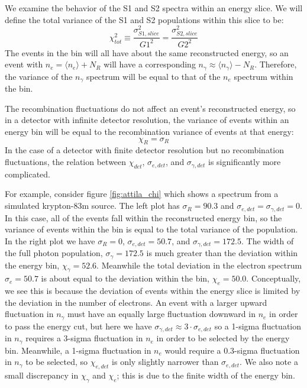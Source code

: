 We examine the behavior of the S1 and S2 spectra within an energy slice. We will define the total variance of the S1 and S2 populations within this slice to be:
\begin{equation}
\chi_{tot}^2\equiv  \frac{\sigma_{S1,slice}^2}{G1^2} = \frac{\sigma_{S2,slice}^2}{G2^2}
\end{equation}
The events in the bin will all have about the same reconstructed energy, so an event with $n_{e}=\langle n_{e} \rangle +N_R$ will have a corresponding $n_{\gamma}\approx \langle n_{\gamma} \rangle -N_R$. Therefore, the variance of the $n_{\gamma}$ spectrum will be equal to that of the $n_{e}$ spectrum within the bin. 

The recombination fluctuations do not affect an event's reconstructed energy, so in a detector with infinite detector resolution, the variance of events within an energy bin will be equal to the recombination variance of events at that energy:
\begin{equation} 
\chi_{R}=\sigma_{R}
\end{equation}
In the case of a detector with finite detector resolution but no recombination fluctuations, the relation between $\chi_{det}$, $\sigma_{e,det}$, and $\sigma_{\gamma,det}$ is significantly more complicated. 

For example, consider figure \ref{fig:attila_chi} which shows a spectrum from a simulated krypton-83m source. The left plot has $\sigma_R=90.3$ and $\sigma_{e,det}=\sigma_{\gamma,det}=0$. In this case, all of the events fall within the reconstructed energy bin, so the variance of events within the bin is equal to the total variance of the population. In the right plot we have $\sigma_R=0$, $\sigma_{e,det}=50.7$, and $\sigma_{\gamma,det}=172.5$. The width of the full photon population, $\sigma_{\gamma}=172.5$ is much greater than the deviation within the energy bin, $\chi_{\gamma}=52.6$. Meanwhile the total deviation in the electron spectrum $\sigma_{e}=50.7$ is about equal to the deviation within the bin, $\chi_e=50.0$. Conceptually, we see this is because the deviation of events within the energy slice is limited by the deviation in the number of electrons. An event with a larger upward fluctuation in $n_{\gamma}$ must have an equally large fluctuation downward in $n_{e}$ in order to pass the energy cut, but here we have $\sigma_{\gamma,det} \approx 3 \cdot \sigma_{e,det}$ so a 1-sigma fluctuation in $n_{\gamma}$ requires a 3-sigma fluctuation in $n_{e}$ in order to be selected by the energy bin. Meanwhile, a 1-sigma fluctuation in $n_{e}$ would require a 0.3-sigma fluctuation in $n_{\gamma}$ to be selected, so $\chi_{e,det}$ is only slightly narrower than $\sigma_{e,det}$. We also note a small discrepancy in $\chi_{\gamma}$ and $\chi_e$; this is due to the finite width of the energy bin\cite{attila}. 

